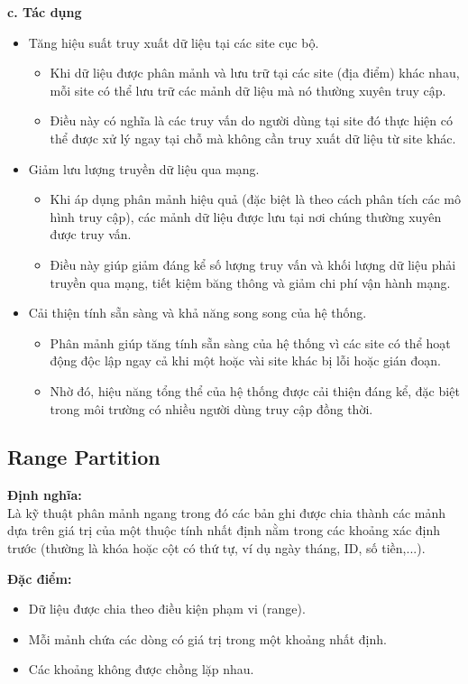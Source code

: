 \documentclass[14pt]{extarticle}
\begin{document}
\textbf{c. Tác dụng}
\begin{itemize}
    \item Tăng hiệu suất truy xuất dữ liệu tại các site cục bộ.
    \begin{itemize}
        \item Khi dữ liệu được phân mảnh và lưu trữ tại các site (địa điểm) khác nhau, mỗi site có thể lưu trữ các mảnh dữ liệu mà nó thường xuyên truy cập. 
        \item Điều này có nghĩa là các truy vấn do người dùng tại site đó thực hiện có thể được xử lý ngay tại chỗ mà không cần truy xuất dữ liệu từ site khác. 
    \end{itemize}
    \item Giảm lưu lượng truyền dữ liệu qua mạng.
    \begin{itemize}
        \item Khi áp dụng phân mảnh hiệu quả (đặc biệt là theo cách phân tích các mô hình truy cập), các mảnh dữ liệu được lưu tại nơi chúng thường xuyên được truy vấn.  
        \item Điều này giúp giảm đáng kể số lượng truy vấn và khối lượng dữ liệu phải truyền qua mạng, tiết kiệm băng thông và giảm chi phí vận hành mạng.
    \end{itemize}
    \item Cải thiện tính sẵn sàng và khả năng song song của hệ thống.
    \begin{itemize}
        \item Phân mảnh giúp tăng tính sẵn sàng của hệ thống vì các site có thể hoạt động độc lập ngay cả khi một hoặc vài site khác bị lỗi hoặc gián đoạn.
        \item Nhờ đó, hiệu năng tổng thể của hệ thống được cải thiện đáng kể, đặc biệt trong môi trường có nhiều người dùng truy cập đồng thời.
    \end{itemize}
\end{itemize}

\subsection{Range Partition}
\textbf{Định nghĩa:}\\
Là kỹ thuật phân mảnh ngang trong đó các bản ghi được chia thành các mảnh dựa trên giá trị của một thuộc tính nhất định nằm trong các khoảng xác định trước (thường là khóa hoặc cột có thứ tự, ví dụ ngày tháng, ID, số tiền,...).

\textbf{Đặc điểm:}
\begin{itemize}
    \item Dữ liệu được chia theo điều kiện phạm vi (range).
    \item Mỗi mảnh chứa các dòng có giá trị trong một khoảng nhất định.
    \item Các khoảng không được chồng lặp nhau.
\end{itemize}
\end{document}
